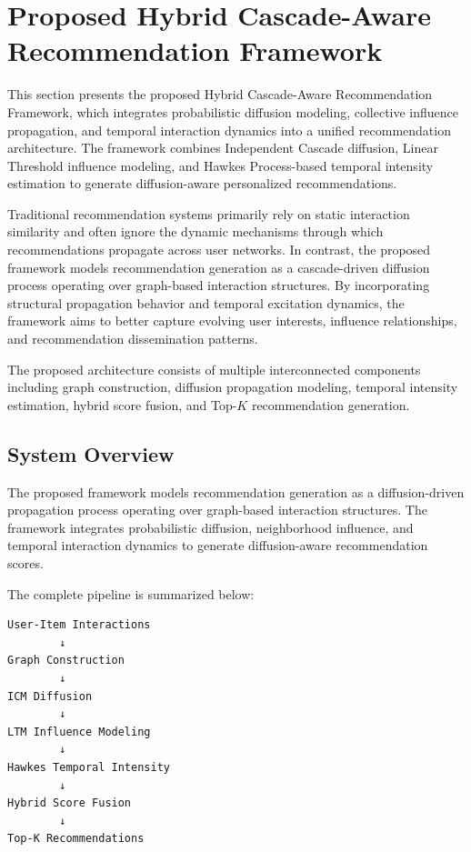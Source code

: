 \documentclass{article}
\begin{document}
\section{Proposed Hybrid Cascade-Aware Recommendation Framework}

This section presents the proposed Hybrid Cascade-Aware Recommendation Framework, which integrates probabilistic diffusion modeling, collective influence propagation, and temporal interaction dynamics into a unified recommendation architecture. The framework combines Independent Cascade diffusion, Linear Threshold influence modeling, and Hawkes Process-based temporal intensity estimation to generate diffusion-aware personalized recommendations.

Traditional recommendation systems primarily rely on static interaction similarity and often ignore the dynamic mechanisms through which recommendations propagate across user networks. In contrast, the proposed framework models recommendation generation as a cascade-driven diffusion process operating over graph-based interaction structures. By incorporating structural propagation behavior and temporal excitation dynamics, the framework aims to better capture evolving user interests, influence relationships, and recommendation dissemination patterns.

The proposed architecture consists of multiple interconnected components including graph construction, diffusion propagation modeling, temporal intensity estimation, hybrid score fusion, and Top-$K$ recommendation generation.


\subsection{System Overview}

The proposed framework models recommendation generation as a diffusion-driven propagation process operating over graph-based interaction structures. The framework integrates probabilistic diffusion, neighborhood influence, and temporal interaction dynamics to generate diffusion-aware recommendation scores.

The complete pipeline is summarized below:

\begin{center}
\begin{verbatim}
User-Item Interactions
        ↓
Graph Construction
        ↓
ICM Diffusion
        ↓
LTM Influence Modeling
        ↓
Hawkes Temporal Intensity
        ↓
Hybrid Score Fusion
        ↓
Top-K Recommendations
\end{verbatim}
\end{center}
\end{document}
